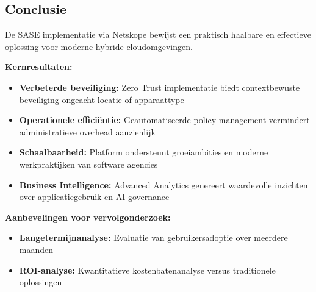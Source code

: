 \documentclass[a0,portrait]{hogent-poster}
\begin{document}
\begin{multicols}{2}
\section{Conclusie}
De SASE implementatie via Netskope bewijst een praktisch haalbare en effectieve oplossing voor moderne hybride cloudomgevingen.

\textbf{Kernresultaten:}
\begin{itemize}
\item \textbf{Verbeterde beveiliging:} Zero Trust implementatie biedt contextbewuste beveiliging ongeacht locatie of apparaattype
\item \textbf{Operationele efficiëntie:} Geautomatiseerde policy management vermindert administratieve overhead aanzienlijk
\item \textbf{Schaalbaarheid:} Platform ondersteunt groeiambities en moderne werkpraktijken van software agencies
\item \textbf{Business Intelligence:} Advanced Analytics genereert waardevolle inzichten over applicatiegebruik en AI-governance
\end{itemize}

\textbf{Aanbevelingen voor vervolgonderzoek:}
\begin{itemize}
\item \textbf{Langetermijnanalyse:} Evaluatie van gebruikersadoptie over meerdere maanden
\item \textbf{ROI-analyse:} Kwantitatieve kostenbatenanalyse versus traditionele oplossingen
\end{itemize}
\end{multicols}
\end{document}
